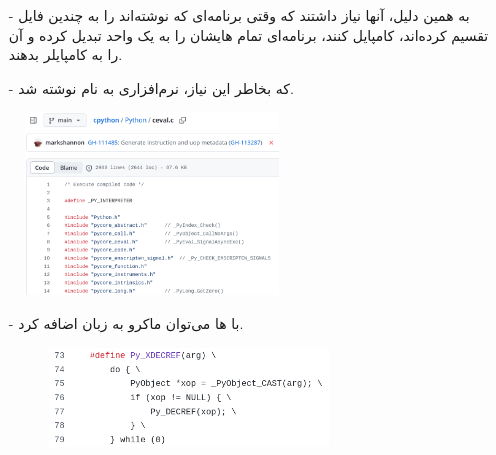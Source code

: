 \begin{frame}{}
\begin{itemize}\itemr
\item[-]
به همین دلیل، آنها نیاز داشتند که وقتی برنامه‌ای که نوشته‌اند را به چندین فایل تقسیم کرده‌اند، کامپایل کنند، برنامه‌ای تمام هایشان را به یک 
واحد تبدیل کرده و آن را به کامپایلر بدهند.

\item[-]
که بخاطر این نیاز، نرم‌افزاری به نام 
نوشته شد.
\end{itemize}
\end{frame}

\begin{frame}{}
\begin{figure}[H]
\begin{center}
\includegraphics[width=0.6\textwidth, height=0.7\textheight]{docs/images/include}
\end{center}
\end{figure}
\end{frame}

\begin{frame}{}
\begin{itemize}\itemr
\item[-]
با ها می‌توان ماکرو به زبان اضافه کرد.

\vspace{5mm}
\begin{figure}[H]
\begin{center}
\includegraphics[width=0.7\textwidth, height=0.5\textheight]{docs/images/define}
\end{center}
\end{figure}
\end{itemize}
\end{frame}

